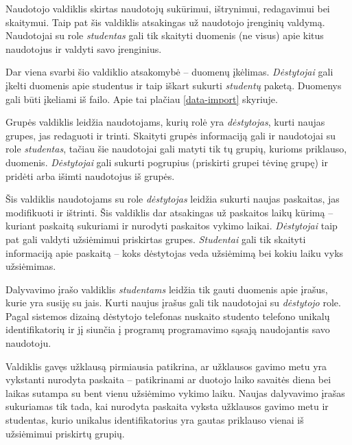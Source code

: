 \documentclass{VUMIFPSbakalaurinis}
\begin{document}
Naudotojo valdiklis skirtas naudotojų sukūrimui, ištrynimui, redagavimui bei skaitymui. Taip pat šis valdiklis atsakingas už naudotojo įrenginių valdymą. Naudotojai su role \textit{studentas} gali tik skaityti duomenis (ne visus) apie kitus naudotojus ir valdyti savo įrenginius.

Dar viena svarbi šio valdiklio atsakomybė – duomenų įkėlimas. \textit{Dėstytojai} gali įkelti duomenis apie studentus ir taip iškart sukurti \textit{studentų} paketą. Duomenys gali būti įkeliami iš failo. Apie tai plačiau \ref{data-import} skyriuje.


Grupės valdiklis leidžia naudotojams, kurių rolė yra \textit{dėstytojas}, kurti naujas grupes, jas redaguoti ir trinti. Skaityti grupės informaciją gali ir naudotojai su role \textit{studentas}, tačiau šie naudotojai gali matyti tik tų grupių, kurioms priklauso, duomenis. \textit{Dėstytojai} gali sukurti pogrupius (priskirti grupei tėvinę grupę) ir pridėti arba išimti naudotojus iš grupės.


Šis valdiklis naudotojams su role \textit{dėstytojas} leidžia sukurti naujas paskaitas, jas modifikuoti ir ištrinti. Šis valdiklis dar atsakingas už paskaitos laikų kūrimą – kuriant paskaitą sukuriami ir nurodyti paskaitos vykimo laikai. \textit{Dėstytojai} taip pat gali valdyti užsiėmimui priskirtas grupes. \textit{Studentai} gali tik skaityti informaciją apie paskaitą – koks dėstytojas veda užsiėmimą bei kokiu laiku vyks užsiėmimas.


Dalyvavimo įrašo valdiklis \textit{studentams} leidžia tik gauti duomenis apie įrašus, kurie yra susiję su jais. Kurti naujus įrašus gali tik naudotojai su \textit{dėstytojo} role. Pagal sistemos dizainą dėstytojo telefonas nuskaito studento telefono unikalų identifikatorių ir jį siunčia į programų programavimo sąsają naudojantis savo naudotoju.

Valdiklis gavęs užklausą pirmiausia patikrina, ar užklausos gavimo metu yra vykstanti nurodyta paskaita – patikrinami ar duotojo laiko savaitės diena bei laikas sutampa su bent vienu užsiėmimo vykimo laiku. Naujas dalyvavimo įrašas sukuriamas tik tada, kai nurodyta paskaita vyksta užklausos gavimo metu ir studentas, kurio unikalus identifikatorius yra gautas priklauso vienai iš užsiėmimui priskirtų grupių.
\end{document}
